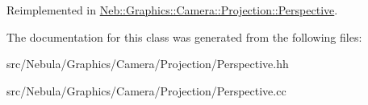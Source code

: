 \-Reimplemented in \hyperlink{classNeb_1_1Graphics_1_1Camera_1_1Projection_1_1Perspective_afeaa87fae6ae8269e0610e5bc314b5e9}{\-Neb\-::\-Graphics\-::\-Camera\-::\-Projection\-::\-Perspective}.



\-The documentation for this class was generated from the following files\-:\begin{DoxyCompactItemize}
\item 
src/\-Nebula/\-Graphics/\-Camera/\-Projection/\-Perspective.\-hh\item 
src/\-Nebula/\-Graphics/\-Camera/\-Projection/\-Perspective.\-cc\end{DoxyCompactItemize}
